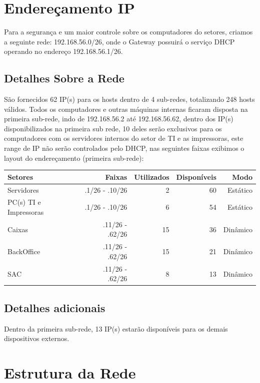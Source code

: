 \documentclass[12pt]{article}
\begin{document}
\section{Endereçamento IP}
Para a segurança e um maior controle sobre os computadores do setores, criamos a seguinte rede: 192.168.56.0/26, onde o Gateway possuirá o serviço DHCP operando no endereço 192.168.56.1/26.

\subsection{Detalhes Sobre a Rede}
São fornecidos 62 IP(s) para os hosts dentro de 4 sub-redes, totalizando 248 hosts válidos. Todos os computadores e outras máquinas internas ficaram disposta na primeira sub-rede, indo de 192.168.56.2 até 192.168.56.62, dentro dos IP(s) disponibilizados na primeira sub rede, 10 deles serão exclusivos para os computadores com os servidores internos do setor de TI e as impressoras, este range de IP não serão controlados pelo DHCP, nas seguintes faixas exibimos o layout do endereçamento (primeira sub-rede):

\begin{center}
\begin{tabular}{| l | r | r | r | r |}
\hline 
Setores & Faixas & Utilizados & Disponíveis & Modo\\
\hline
Servidores & .1/26 - .10/26 & 2 & 60 & Estático\\
PC(s) TI e Impressoras & .1/26 - .10/26 & 6 & 54 & Estático\\
Caixas & .11/26 - .62/26 & 15 & 36 & Dinâmico\\
BackOffice & .11/26 - .62/26 & 15 & 21 & Dinâmico\\
SAC & .11/26 - .62/26 & 8 & 13 & Dinâmico\\
\hline
\end{tabular}
\end{center}

\subsection{Detalhes adicionais}
Dentro da primeira sub-rede, 13 IP(s) estarão disponíveis para os demais dispositivos externos.

\section{Estrutura da Rede}
\end{document}
